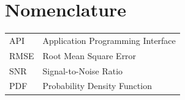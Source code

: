 \chapter*{Nomenclature}

\begin{tabular}{ll}
API & Application Programming Interface \\
RMSE & Root Mean Square Error \\
SNR & Signal-to-Noise Ratio \\
PDF & Probability Density Function \\
\end{tabular}
